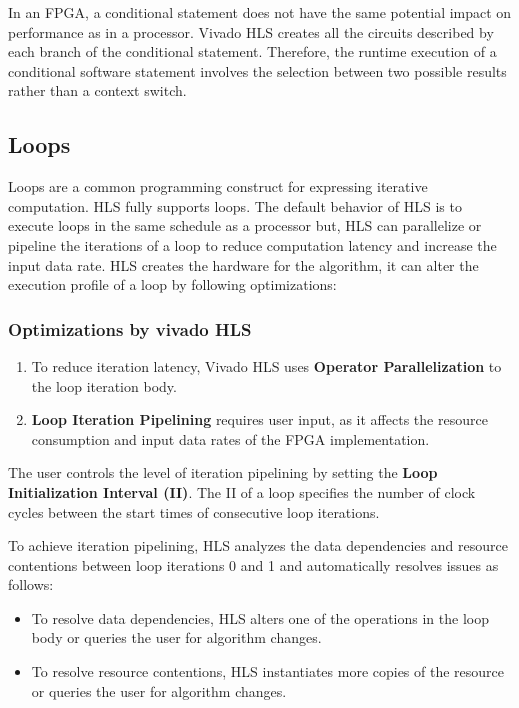   \par In an FPGA, a conditional statement does not have the same potential impact on  performance as in a processor. Vivado HLS creates all the circuits described by each branch of the conditional statement. Therefore, the runtime execution of a conditional software
  statement involves the selection between two possible results rather than a context switch.


\subsection{Loops}
  Loops are a common programming construct for expressing iterative computation. HLS fully supports loops. The default behavior of HLS is to execute loops in the same schedule as a processor but, HLS can parallelize or pipeline the iterations of a loop to reduce computation latency and increase the input data rate. HLS creates the hardware for the algorithm, it can alter the execution profile of a loop by following optimizations:

  \subsubsection{Optimizations by vivado HLS}
  \begin{enumerate}
    \item To reduce iteration latency, Vivado HLS uses \textbf{Operator Parallelization} to the loop iteration body.
    \item \textbf{Loop Iteration Pipelining} requires user input, as it affects the resource consumption and input data rates of the FPGA implementation.
  \end{enumerate}

  The user controls the level of iteration pipelining by setting the
  \textbf{Loop Initialization Interval (II)}. The II of a loop specifies the number of clock cycles between the start times of consecutive loop iterations. 

  \par To achieve iteration pipelining, HLS analyzes the data dependencies and resource contentions between loop iterations 0 and 1 and automatically resolves issues as follows:
  \begin{itemize}
    \item To resolve data dependencies, HLS alters one of the operations in the loop body or
    queries the user for algorithm changes.
    \item To resolve resource contentions, HLS instantiates more copies of the resource or
    queries the user for algorithm changes.
  \end{itemize}

